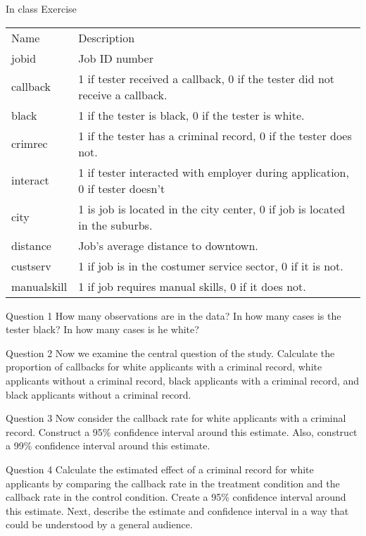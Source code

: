 \documentclass[presentation]{beamer}
\begin{document}
\begin{frame}[shrink=30,label={sec:org31716a0}]{In class Exercise}
\begin{center}
\begin{tabular}{ll}
Name & Description\\
jobid & Job ID number\\
callback & 1 if tester received a callback, 0 if the tester did not receive a callback.\\
black & 1 if the tester is black, 0 if the tester is white.\\
crimrec & 1 if the tester has a criminal record, 0 if the tester does not.\\
interact & 1 if tester interacted with employer during application, 0 if tester doesn’t\\
city & 1 is job is located in the city center, 0 if job is located in the suburbs.\\
distance & Job’s average distance to downtown.\\
custserv & 1 if job is in the costumer service sector, 0 if it is not.\\
manualskill & 1 if job requires manual skills, 0 if it does not.\\
\end{tabular}
\end{center}
\end{frame}


\begin{frame}[label={sec:orgd927e0b}]{Question 1}
How many observations are in the data? In how many cases is the tester black? In how many cases is he white?
\end{frame}

\begin{frame}[label={sec:org120f30f}]{Question 2}
Now we examine the central question of the study. Calculate the proportion of callbacks for white applicants with a criminal record, white applicants without a criminal record, black applicants with a criminal record, and black applicants without a criminal record.
\end{frame}

\begin{frame}[label={sec:org73885d6}]{Question 3}
Now consider the callback rate for white applicants with a criminal record. Construct a 95\% confidence interval around this estimate. Also, construct a 99\% confidence interval around this estimate.
\end{frame}

\begin{frame}[label={sec:orge779d42}]{Question 4}
Calculate the estimated effect of a criminal record for white applicants by comparing the callback rate in the treatment condition and the callback rate in the control condition. Create a 95\% confidence interval around this estimate. Next, describe the estimate and confidence interval in a way that could be understood by a general audience.
\end{frame}
\end{document}
